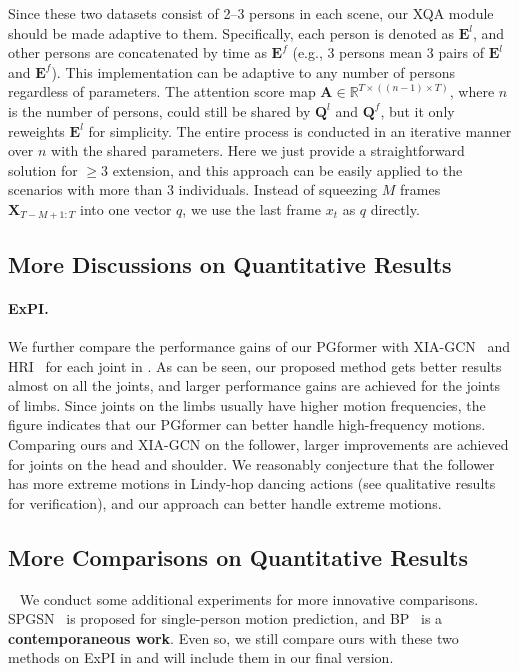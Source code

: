 \documentclass[10pt,twocolumn,letterpaper]{article}
\begin{document}
Since these two datasets consist of 2--3 persons in each scene, our XQA module should be made adaptive to them. 
Specifically, each person is denoted as $\bm{E}^l$, and other persons are concatenated by time as $\bm{E}^f$ (e.g., 3 persons mean 3 pairs of $\bm{E}^l$ and $\bm{E}^f$). 
This implementation can be adaptive to any number of persons regardless of parameters. 
The attention score map $\bm{A} \in \mathbb{R}^{T \times ((n-1) \times T)}$, where $n$ is the number of persons, could still be shared by $\bm{Q}^l$ and $\bm{Q}^f$, but it only reweights $\bm{E}^l$ for simplicity. 
The entire process is conducted in an iterative manner over $n$ with the shared parameters. 
Here we just provide a straightforward solution for $\geq 3$ extension, and this approach can be easily applied to the scenarios with more than 3 individuals. 
Instead of squeezing $M$ frames $\bm{X}_{T-M+1:T}$ into one vector $q$, we use the last frame $x_t$ as $q$ directly.


\subsection{More Discussions on Quantitative Results}

\paragraph{ExPI.} 
We further compare the performance gains of our PGformer with XIA-GCN~\cite{guo2021multi} and HRI~\cite{mao2020history} for each joint in . 
As can be seen, our proposed method gets better results almost on all the joints, and larger performance gains are achieved for the joints of limbs. 
Since joints on the limbs usually have higher motion frequencies, the figure indicates that our PGformer can better handle high-frequency motions.
Comparing ours and XIA-GCN on the follower, larger improvements are achieved for joints on the head and shoulder. 
We reasonably conjecture that the follower has more extreme motions in Lindy-hop dancing actions (see qualitative results for verification), and our approach can better handle extreme motions.

\subsection{More Comparisons on Quantitative Results}~\label{app_subsec:more_results}
We conduct some additional experiments for more innovative comparisons. 
SPGSN~\cite{li2022spgsn} is proposed for single-person motion prediction, and BP~\cite{rahman2023best} is a \textbf{contemporaneous work}.
Even so, we still compare ours with these two methods on ExPI in  and will include them in our final version. 
\end{document}
